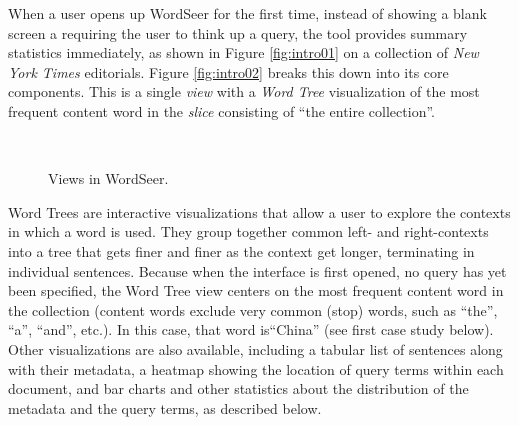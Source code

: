 \documentclass{sig-alternate}
\begin{document}
When a user opens up WordSeer for the first time, instead of  showing a blank screen a requiring the user to think up a query, the tool  provides summary statistics immediately, as shown in Figure \ref{fig:intro01} on a collection of \emph{New York Times} editorials.  Figure \ref{fig:intro02} breaks this down into its core components. This is a single \emph{view} with a \emph{Word Tree} visualization of the most frequent content word in the \emph{slice} consisting of ``the entire collection''. 

\begin{figure}[ht!]
\begin{center}
%
        \\
%
    \end{center}
    \caption{%
       Views in WordSeer.
     }%
\end{figure}

Word Trees \cite{wattenberg_word_2008} are interactive visualizations that allow a user to explore the contexts in which a word is used. They group together common left- and right-contexts into a tree that gets finer and finer as the context get longer, terminating in individual sentences.  Because when the interface is first opened, no query has yet been specified, the Word Tree view centers on the most frequent content word in the collection (content words exclude very common (stop) words, such as ``the'', ``a'', ``and'', etc.). In this case, that word is``China'' (see first case study below).  Other visualizations are also available, including a tabular list of sentences along with their metadata, a heatmap showing the location of query terms within each document, and bar charts and other statistics about the distribution of the metadata and the query terms, as described below.
\end{document}
